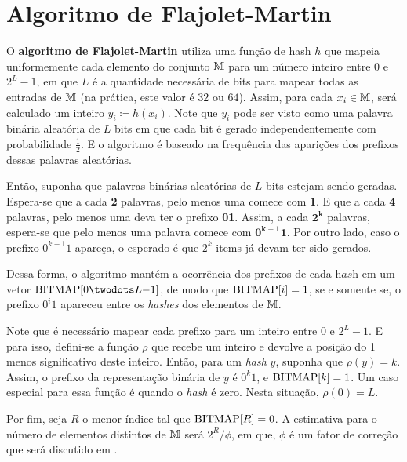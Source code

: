 \section{Algoritmo de Flajolet-Martin}
\label{sec:flajolet-martin:algorithm}

O \textbf{algoritmo de Flajolet-Martin} utiliza uma função de hash $h$ que mapeia uniformemente cada elemento do 
conjunto $\mathbb{M}$ para um número inteiro entre $0$ e $2^L-1$, em que $L$ é a quantidade necessária de bits para 
mapear todas as entradas de $\mathbb{M}$ (na prática, este valor é $32$ ou $64$). Assim, para cada $x_i \in \mathbb{M}$, 
será calculado um inteiro $y_i \coloneqq h(x_i)$. Note que $y_i$ pode ser visto como uma palavra binária aleatória de 
$L$ bits em que cada bit é gerado independentemente com probabilidade $\frac{1}{2}$. E o algoritmo é baseado na 
frequência das aparições dos prefixos dessas palavras aleatórias.

Então, suponha que palavras binárias aleatórias de $L$ bits estejam sendo geradas. Espera-se que a cada \textbf{2} 
palavras, pelo menos uma comece com \textbf{1}. E que a cada \textbf{4} palavras, pelo menos uma deva ter o prefixo 
\textbf{01}. Assim, a cada $\mathbf{2^k}$ palavras, espera-se que pelo menos uma palavra comece com $\mathbf{0^{k-1}1}$. 
Por outro lado, caso o prefixo $0^{k-1}1$ apareça, o esperado é que $2^{k}$ items já devam ter sido gerados. 

Dessa forma, o algoritmo mantém a ocorrência dos prefixos de cada $\textit{hash}$ em um vetor 
$\bitmap[0 \twodots L{-}1]$, de modo que $\text{BITMAP}[i] = 1$, se e somente se, o prefixo $0^i1$ apareceu entre os 
\textit{hashes} dos elementos de $\mathbb{M}$. 

Note que é necessário mapear cada prefixo para um inteiro entre $0$ e $2^{L} - 1$. E para isso, defini-se a função $\rho$ 
que recebe um inteiro e devolve a posição do 1 menos significativo deste inteiro. Então, para um \textit{hash} $y$, 
suponha que $\rho(y) = k$. Assim, o prefixo da representação binária de $y$ é $0^k1$, e $\text{BITMAP}[k] = 1$. Um caso 
especial para essa função é quando o \textit{hash} é zero. Nesta situação, $\rho(0) = L$.

Por fim, seja $R$ o menor índice tal que $\text{BITMAP}[R] = 0$. A estimativa para o número de elementos distintos de 
$\mathbb{M}$ será $2^R/\phi$, em que, $\phi$ é um fator de correção que será discutido em 
.

